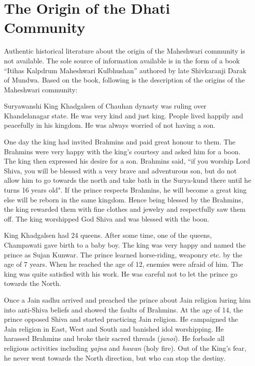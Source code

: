 \chapter{The Origin of the Dhati Community}
Authentic historical literature about the origin of the Maheshwari community is
not available. The sole source of information available is in the form of a
book ``Itihas Kalpdrum Maheshwari Kulbhushan'' authored by late Shivkaranji
Darak of Mundwa. Based on the book, following is the description of the origins
of the Maheshwari community:

Suryawanshi King Khadgalsen of Chauhan dynasty was ruling over Khandelanagar
state. He was very kind and just king. People lived happily and peacefully in
his kingdom. He was always worried of not having a son.

One day the king had invited Brahmins and paid great honour to them. The
Brahmins were very happy with the king's courtesy and asked him for a boon. The
king then expressed his desire for a son. Brahmins said, ``if you worship Lord
Shiva, you will be blessed with a very brave and adventurous son, but do not
allow him to go towards the north and take bath in the Surya-kund there until
he turns 16 years old". If the prince respects Brahmins, he will become a great
king else will be reborn in the same kingdom. Hence being blessed by the
Brahmins, the king rewarded them with fine clothes and jewelry and respectfully
saw them off. The king worshipped God Shiva and was blessed with the boon.

King Khadgalsen had 24 queens. After some time, one of the queens, Champawati
gave birth to a baby boy. The king was very happy and named the prince as Sujan
Kunwar. The prince learned horse-riding, weaponry etc. by the age of 7 years.
When he reached the age of 12, enemies were afraid of him. The king was quite
satisfied with his work. He was careful not to let the prince go towards the
North.

Once a Jain sadhu arrived and preached the prince about Jain religion luring him
into anti-Shiva beliefs and showed the faults of Brahmins. At the age of 14,
the prince opposed Shiva and started practicing Jain religion. He
campaigned the Jain religion in East, West and South and banished idol
worshipping. He harassed Brahmins and broke their sacred threads
(\textit{janoi}). He forbade all religious activities including \textit{yajna}
and \textit{hawan} (holy fire). Out of the King's fear, he never went towards
the North direction, but who can stop the destiny.

